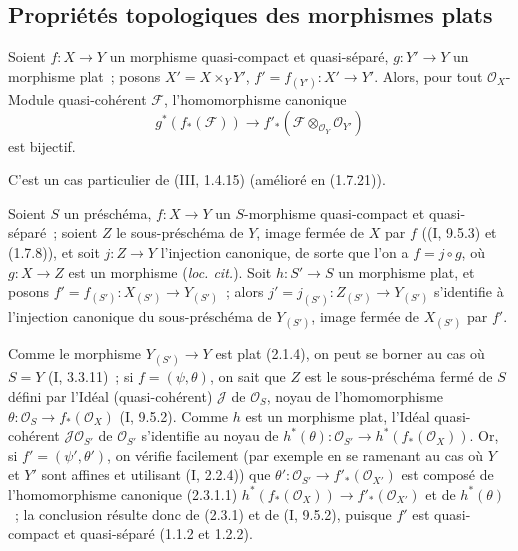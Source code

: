 \subsection{Propriétés topologiques des morphismes plats}
\label{subsection:IV.2.3-fr}

\begin{lemma}[2.3.1]
\label{IV.2.3.1-fr}
Soient $f:X\to Y$ un morphisme quasi-compact et quasi-séparé,
$g:Y'\to Y$ un morphisme plat~; posons $X'=X\times_Y Y'$,
$f'=f_{(Y')}:X'\to Y'$. Alors, pour tout $\mathcal O_X$-Module quasi-cohérent
$\mathscr F$, l'homomorphisme canonique
\begin{equation}
\tag{2.3.1.1}
\label{IV.2.3.1.1-fr}
  g^*(f_*(\mathscr F))\to
  f'_*(\mathscr F\otimes_{\mathcal O_Y}\mathcal O_{Y'})
\end{equation}
est bijectif.
\end{lemma}

C'est un cas particulier de (III, 1.4.15) (amélioré en (1.7.21)).

\begin{proposition}[2.3.2]
\label{IV.2.3.2-fr}
Soient $S$ un préschéma, $f:X\to Y$ un $S$-morphisme quasi-compact et
quasi-séparé~; soient $Z$ le sous-préschéma de $Y$, image fermée de $X$ par
$f$ ((I, 9.5.3) et (1.7.8)), et soit $j:Z\to Y$ l'injection canonique, de
sorte que l'on a $f=j\circ g$, où $g:X\to Z$ est un morphisme
(\emph{loc. cit.}). Soit $h:S'\to S$ un morphisme plat, et posons
$f'=f_{(S')}:X_{(S')}\to Y_{(S')}$~; alors
$j'=j_{(S')}:Z_{(S')}\to Y_{(S')}$ s'identifie à l'injection canonique du
sous-préschéma de $Y_{(S')}$, image fermée de $X_{(S')}$ par $f'$.
\end{proposition}

Comme le morphisme $Y_{(S')}\to Y$ est plat (2.1.4), on peut se borner au cas
où $S=Y$ (I, 3.3.11)~; si $f=(\psi,\theta)$, on sait que $Z$ est le
sous-préschéma fermé de $S$ défini par l'Idéal (quasi-cohérent) $\mathscr J$
de $\mathcal O_S$, noyau de l'homomorphisme
$\theta:\mathcal O_S\to f_*(\mathcal O_X)$ (I, 9.5.2). Comme $h$ est un
morphisme plat, l'Idéal quasi-cohérent $\mathscr J\mathcal O_{S'}$ de
$\mathcal O_{S'}$ s'identifie au noyau de
$h^*(\theta):\mathcal O_{S'}\to h^*(f_*(\mathcal O_X))$. Or, si
$f'=(\psi',\theta')$, on vérifie facilement (par exemple en se ramenant au
cas où $Y$ et $Y'$ sont affines et utilisant (I, 2.2.4)) que
$\theta':\mathcal O_{S'}\to f'_*(\mathcal O_{X'})$ est composé de
l'homomorphisme canonique (2.3.1.1)
$h^*(f_*(\mathcal O_X))\to f'_*(\mathcal O_{X'})$ et de $h^*(\theta)$~; la
conclusion résulte donc de (2.3.1) et de (I, 9.5.2), puisque $f'$ est
quasi-compact et quasi-séparé (1.1.2 et 1.2.2).

